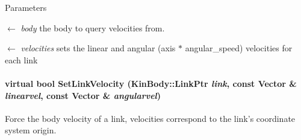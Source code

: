 \begin{DoxyParams}{Parameters}
\item[\mbox{$\leftarrow$} {\em body}]the body to query velocities from. \item[\mbox{$\leftarrow$} {\em velocities}]sets the linear and angular (axis $\ast$ angular\_\-speed) velocities for each link \end{DoxyParams}
\hypertarget{classOpenRAVE_1_1PhysicsEngineBase_a22f75fdf00f98694da099efeb13bff41}{
\paragraph[{SetLinkVelocity}]{\setlength{\rightskip}{0pt plus 5cm}virtual bool SetLinkVelocity (KinBody::LinkPtr {\em link}, \/  const Vector \& {\em linearvel}, \/  const Vector \& {\em angularvel})}\hfill}
\label{classOpenRAVE_1_1PhysicsEngineBase_a22f75fdf00f98694da099efeb13bff41}


Force the body velocity of a link, velocities correspond to the link's coordinate system origin. 


